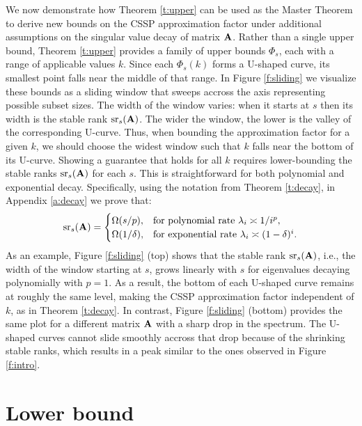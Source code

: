 \documentclass{article}
\begin{document}
We now demonstrate how Theorem \ref{t:upper} can be used as the Master Theorem to derive new
bounds on the CSSP approximation factor under additional assumptions
on the singular value decay of matrix $\mathbf A$. Rather than a single upper
bound, Theorem \ref{t:upper} provides a family of upper bounds
$\Phi_s$, each with a range of applicable values $k$. Since each
$\Phi_s(k)$ forms a U-shaped curve, its smallest point falls near the
middle of that range. In Figure \ref{f:sliding} we visualize these bounds as a sliding
window that sweeps accross the axis representing possible subset
sizes. The width of the window varies: when it starts at $s$ 
then its width is the stable rank ${\mathrm{sr}}_s(\mathbf A)$. The wider the window,
the lower is the valley of the corresponding U-curve. Thus, when
bounding the approximation factor for a given $k$, we should choose
the widest window such that $k$ falls near the bottom of its
U-curve. Showing a guarantee that holds for all $k$ requires lower-bounding the
stable ranks ${\mathrm{sr}}_s(\mathbf A)$ for each $s$. This is straightforward for
both polynomial and exponential decay. Specifically, using the
notation from Theorem \ref{t:decay}, in Appendix \ref{a:decay} we
prove that:
\begin{align*}
  {\mathrm{sr}}_s(\mathbf A) =
  \begin{cases}
    \Omega(s/p), &\text{for polynomial rate  $\lambda_i\asymp1/i^p$},\\
    \Omega(1/\delta),&\text{for exponential rate $\lambda_i\asymp(1-\delta)^i$}.
    \end{cases}
  \end{align*}
As an example, Figure \ref{f:sliding} (top) shows that the stable rank ${\mathrm{sr}}_s(\mathbf A)$, i.e.,
the width of the window starting at $s$, grows linearly with $s$ for eigenvalues
decaying polynomially with $p=1$. As a result, the bottom of each
U-shaped curve remains at roughly the same level, making the CSSP
approximation factor independent of $k$, as in Theorem
\ref{t:decay}. In contrast, Figure \ref{f:sliding} (bottom) provides
the same plot for a different matrix $\mathbf A$ with a sharp drop in the spectrum. The U-shaped
curves cannot slide smoothly accross that drop because of the
shrinking stable ranks, which results in a peak similar to the ones
observed in Figure \ref{f:intro}.


 
 \section{Lower bound}\label{s:lower}
\end{document}
